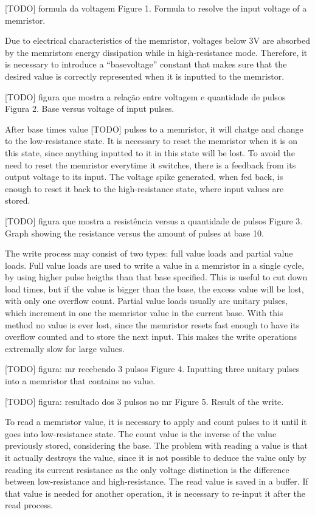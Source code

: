 \documentclass[ecp,tc,english]{iiufrgs}
\begin{document}
[TODO] formula da voltagem
Figure 1. Formula to resolve the input voltage of a memristor.

Due to electrical characteristics of the memristor, voltages below 3V are absorbed by the memristors energy dissipation while in high-resistance mode. Therefore, it is necessary to introduce a “basevoltage” constant that makes sure that the desired value is correctly represented when it is inputted to the memristor.

[TODO] figura que mostra a relação entre voltagem e quantidade de pulsos
Figura 2. Base versus voltage of input pulses.

After base times value [TODO] pulses to a memristor, it will chatge and change to the low-resistance state. It is necessary to reset the memristor when it is on this state, since anything inputted to it in this state will be lost. To avoid the need to reset the memristor everytime it switches, there is a feedback from its output voltage to its input. The voltage spike generated, when fed back, is enough to reset it back to the high-resistance state, where input values are stored.

[TODO] figura que mostra a resistência versus a quantidade de pulsos
Figure 3. Graph showing the resistance versus the amount of pulses at base 10.

The write process may consist of two types: full value loads and partial value loads. Full value loads are used to write a value in a memristor in a single cycle, by using higher pulse heigths than that base specified. This is useful to cut down load times, but if the value is bigger than the base, the excess value will be lost, with only one overflow count. Partial value loads usually are unitary pulses, which increment in one the memristor value in the current base. With this method no value is ever lost, since the memristor resets fast enough to have its overflow counted and to store the next input. This makes the write operations extremally slow for large values.

[TODO] figura: mr recebendo 3 pulsos
Figure 4. Inputting three unitary pulses into a memristor that contains no value.

[TODO] figura: resultado dos 3 pulsos no mr
Figure 5. Result of the write.

To read a memristor value, it is necessary to apply and count pulses to it until it goes into low-resistance state. The count value is the inverse of the value previously stored, considering the base. The problem with reading a value is that it actually destroys the value, since it is not possible to deduce the value only by reading its current resistance as the only voltage distinction is the difference between low-resistance and high-resistance. The read value is saved in a buffer. If that value is needed for another operation, it is necessary to re-input it after the read process.
\end{document}

